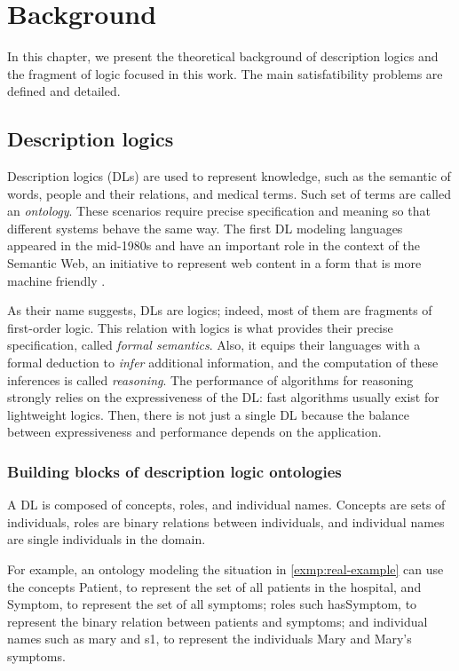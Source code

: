 
\chapter{Background}
\label{cap:background}

In this chapter, we present the theoretical background of description logics and the fragment of logic focused in this work. The main satisfatibility problems are defined and detailed.  

\section{Description logics}
Description logics (DLs) are used to represent knowledge, such as the semantic of words,  people and their relations, and medical terms. Such set of terms are called an \emph{ontology}. These scenarios require precise specification and meaning so that different systems behave the same way. The first DL modeling languages appeared in the mid-1980s and have an important role in the context of the Semantic Web, an initiative to represent web content in a form that is more machine friendly \citep{krotzsch2012description}.

As their name suggests, DLs are logics; indeed, most of them are fragments of first-order logic. This relation with logics is what provides their precise specification, called \emph{formal semantics}. Also, it equips their languages with a formal deduction to \emph{infer} additional information, and the computation of these inferences is called \emph{reasoning}. The performance of algorithms for reasoning strongly relies on the expressiveness of the DL: fast algorithms usually exist for lightweight logics. Then, there is not just a single DL because the balance between expressiveness and performance depends on the application. \citep{krotzsch2012description}

\subsection{Building blocks of description logic ontologies}
A DL is composed of concepts, roles, and individual names. Concepts are sets of individuals, roles are binary relations between individuals, and individual names are single individuals in the domain.

For example, an ontology modeling the situation in \cref{exmp:real-example} can use the concepts \textsf{Patient}, to represent the set of all patients in the hospital, and \textsf{Symptom}, to represent the set of all symptoms; roles such \textsf{hasSymptom}, to represent the binary relation between patients and symptoms; and individual names such as \textsf{mary} and \textsf{s1}, to represent the individuals Mary and Mary's symptoms.

